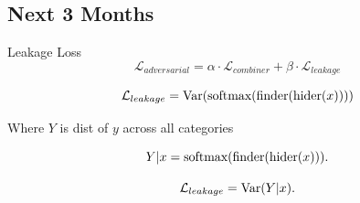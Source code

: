 \documentclass[10pt]{beamer}
\begin{document}
\subsection{Next 3 Months}

\appendix
\begin{frame}[fragile]{Leakage Loss}
\begin{equation}
\label{eq:ladver}
    \mathcal{L}_{adversarial} = \alpha \cdot \mathcal{L}_{combiner} + \beta \cdot \mathcal{L}_{leakage}
\end{equation}


\begin{equation}
\label{equation:leak}
    \mathcal{L}_{leakage} = \textup{Var}(\textup{softmax}(\textup{finder}(\textup{hider}(x))))
\end{equation}

Where $Y$ is dist of $y$ across all categories

\begin{equation}
    Y | x = \textup{softmax}(\textup{finder}(\textup{hider}(x))).
\end{equation}

\begin{equation}
\label{equation:leak2}
    \mathcal{L}_{leakage} = \textup{Var}(Y | x).
\end{equation}

\end{frame}
\end{document}
